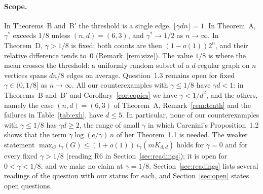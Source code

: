 \documentclass[11pt]{article}
\theoremstyle{remark}
\begin{document}
\paragraph{Scope.}
In Theorems~B and~B$'$ the
threshold is a single edge, $\lfloor\gamma dn\rfloor=1$. In Theorem~A,
$\gamma^*$ exceeds $1/8$ unless $(n,d)=(6,3)$, and $\gamma^*\to1/2$ as
$n\to\infty$. In Theorem~D, $\gamma>1/8$ is fixed; both counts are then
$(1-o(1))2^n$, and their relative difference tends to~$0$
(Remark~\ref{rem:size}). The value $1/8$ is where the mean crosses the
threshold: a uniformly random subset of a $d$-regular graph on $n$ vertices
spans $dn/8$ edges on average. Question~1.3 remains open for fixed
$\gamma\in(0,1/8]$ as $n\to\infty$. All our counterexamples with
$\gamma\le1/8$ have $\gamma d<1$: in Theorems~B and~B$'$ and
Corollary~\ref{cor:copies} we have $\gamma<1/d^2$, and the others, namely
the case $(n,d)=(6,3)$ of Theorem~A, Remark~\ref{rem:tenth} and the
failures in Table~\ref{tab:exh}, have $d\le5$. In particular, none of our
counterexamples with $\gamma\le1/8$ has $\gamma d\ge2$, the range of small
$\gamma$ in which
Carenini's Proposition~1.2 shows that the term $\gamma\log(e/\gamma)\,n$ of
her Theorem~1.1 is needed. The weaker statement
$\max_Gi_\gamma(G)\le(1+o(1))\,i_\gamma(mK_{d,d})$ holds for $\gamma=0$ and
for every fixed $\gamma>1/8$ (reading R6 in Section~\ref{sec:readings}); it
is open for $0<\gamma<1/8$, and we make no claim at $\gamma=1/8$.
Section~\ref{sec:readings} lists several readings of the question with our
status for each, and Section~\ref{sec:open} states open questions.
\end{document}

